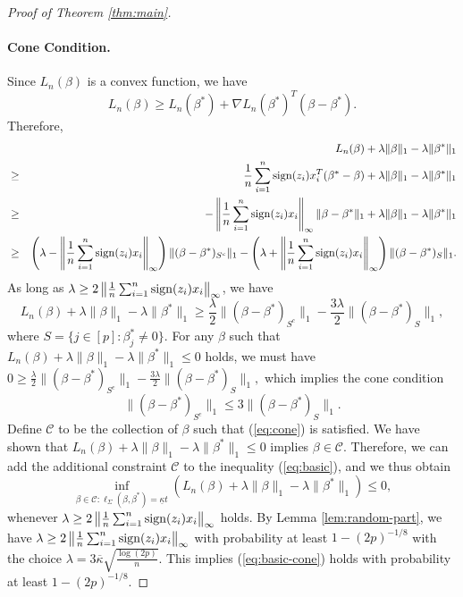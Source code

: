 \begin{proof}[Proof of Theorem \ref{thm:main}]
\paragraph{Cone Condition.}
Since $L_n(\beta)$ is a convex function, we have
$$L_n(\beta)\geq L_n(\beta^*)+\nabla L_n(\beta^*)^T(\beta-\beta^*).$$
Therefore,
\begin{eqnarray*}
&& L_n(\beta)+\lambda\|\beta\|_1-\lambda\|\beta^*\|_1 \\
&\geq& \frac{1}{n}\sum_{i=1}^n\sgn(z_i)x_i^T(\beta^*-\beta)+\lambda\|\beta\|_1-\lambda\|\beta^*\|_1 \\
&\geq& -\left\|\frac{1}{n}\sum_{i=1}^n\sgn(z_i)x_i\right\|_{\infty}\|\beta-\beta^*\|_1+\lambda\|\beta\|_1-\lambda\|\beta^*\|_1  \\
&\geq& \left(\lambda-\left\|\frac{1}{n}\sum_{i=1}^n\sgn(z_i)x_i\right\|_{\infty}\right)\|(\beta-\beta^*)_{S^c}\|_1 - \left(\lambda+\left\|\frac{1}{n}\sum_{i=1}^n\sgn(z_i)x_i\right\|_{\infty}\right)\|(\beta-\beta^*)_{S}\|_1.
\end{eqnarray*}
As long as $\lambda\geq 2\left\|\frac{1}{n}\sum_{i=1}^n\mathop{\rm sign}(z_i)x_i\right\|_{\infty}$, we have
$$L_n(\beta)+\lambda\|\beta\|_1-\lambda\|\beta^*\|_1 \geq \frac{\lambda}{2}\|(\beta-\beta^*)_{S^c}\|_1-\frac{3\lambda}{2}\|(\beta-\beta^*)_{S}\|_1,$$
where $S=\{j\in[p]:\beta_j^*\neq 0\}$.
For any $\beta$ such that $L_n(\beta)+\lambda\|\beta\|_1-\lambda\|\beta^*\|_1\leq 0$ holds, we must have $0\geq \frac{\lambda}{2}\|(\beta-\beta^*)_{S^c}\|_1-\frac{3\lambda}{2}\|(\beta-\beta^*)_{S}\|_1,$
which implies the cone condition
\begin{equation}
\|(\beta-\beta^*)_{S^c}\|_1\leq 3\|(\beta-\beta^*)_{S}\|_1.\label{eq:cone}
\end{equation}
Define $\mathcal{C}$ to be the collection of $\beta$ such that (\ref{eq:cone}) is satisfied. We have shown that $L_n(\beta)+\lambda\|\beta\|_1-\lambda\|\beta^*\|_1\leq 0$ implies $\beta\in\mathcal{C}$. Therefore, we can add the additional constraint $\mathcal{C}$ to the inequality (\ref{eq:basic}), and we thus obtain
\begin{equation}
\inf_{\beta\in\mathcal{C}:\ell_{\Sigma}(\beta,\beta^*)=\underline{\kappa}t}(L_n(\beta)+\lambda\|\beta\|_1-\lambda\|\beta^*\|_1)\leq 0, \label{eq:basic-cone}
\end{equation}
whenever $\lambda\geq 2\left\|\frac{1}{n}\sum_{i=1}^n\mathop{\rm sign}(z_i)x_i\right\|_{\infty}$ holds.
By Lemma \ref{lem:random-part}, we have $\lambda\geq 2\left\|\frac{1}{n}\sum_{i=1}^n\mathop{\rm sign}(z_i)x_i\right\|_{\infty}$ with probability at least $1-(2p)^{-1/8}$ with the choice $\lambda=3\overline{\kappa}\sqrt{\frac{\log(2p)}{n}}$. This implies (\ref{eq:basic-cone}) holds with probability at least $1-(2p)^{-1/8}$.


\end{proof}
